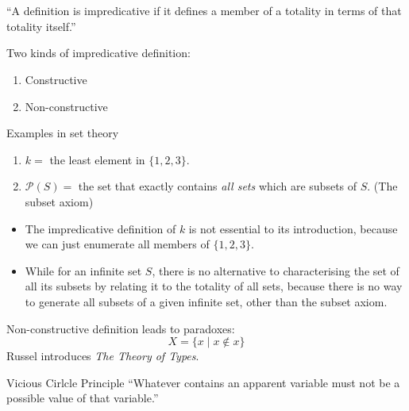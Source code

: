 \documentclass{beamer}
\begin{document}
\section{\secImpredicativity}

\begin{frame}{\subImprDef}
	\begin{block}{}
		``A deﬁnition is impredicative if it deﬁnes a member of a totality in terms of that totality itself.'' \cite{van2017predicativity}
		\vspace{1ex}
	\end{block}
	Two kinds of impredicative definition:
	\begin{enumerate}
		\item Constructive
		\item Non-constructive
	\end{enumerate}
\end{frame}

\begin{frame}{\subImprDef}
	\begin{exampleblock}{Examples in set theory}
		\begin{enumerate}
			\item $k =$ the least element in $\{1, 2, 3\}$.
			\item $\mathcal{P}(S) =$ the set that exactly contains \emph{all sets} which are subsets of $S$. (The subset axiom)
		\end{enumerate}
	\end{exampleblock}
	\begin{itemize}
		\item The impredicative deﬁnition	of $k$ is not essential to its introduction, because we can just enumerate all members of $\{ 1, 2, 3\}$.
		\item While for an inﬁnite set $S$, there is no alternative to characterising the set of all its subsets by relating it to the totality of all sets, because there is no way to generate all subsets of a given inﬁnite set, other than the subset axiom.
	\end{itemize}
\end{frame}

\begin{frame}{\subImprDef}
	Non-constructive definition leads to paradoxes:
	\[X = \{ x \mid x \notin x \} \]
	Russel introduces \emph{The Theory of Types}.
	\begin{block}{Vicious Cirlcle Principle}
		``Whatever contains an apparent variable must not be a possible value of that variable.'' \cite{russell1908mathematical}
		\vspace{1ex}
	\end{block}
\end{frame}
\end{document}
